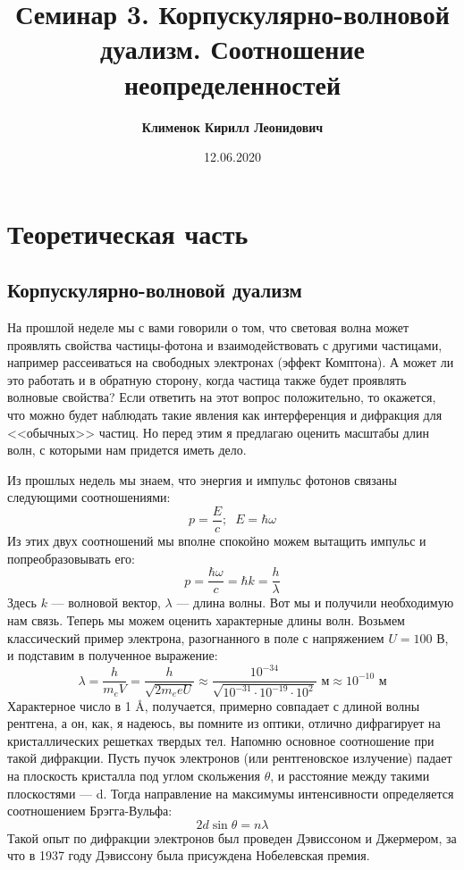 \documentclass[12pt]{article}
\begin{document}
 

\title{\textbf{Семинар 3. Корпускулярно-волновой дуализм. Соотношение неопределенностей}}
\author{\textbf{Клименок Кирилл Леонидович}}
\date{12.06.2020}
\maketitle

\section{Теоретическая часть}

\subsection{Корпускулярно-волновой дуализм}
На прошлой неделе мы с вами говорили о том, что световая волна может проявлять свойства частицы-фотона и взаимодействовать с другими частицами, например рассеиваться на свободных электронах (эффект Комптона). А может ли это работать и в обратную сторону, когда частица также будет проявлять волновые свойства? Если ответить на этот вопрос положительно, то окажется, что можно будет наблюдать такие явления как интерференция и дифракция для <<обычных>> частиц. Но перед этим я предлагаю оценить масштабы длин волн, с которыми нам придется иметь дело. 

\vspace{1em} \noindent
Из прошлых недель мы знаем, что энергия и импульс фотонов связаны следующими соотношениями:
\begin{equation*}
    p = \dfrac{E}{c}; \;\; E = \hbar \omega
\end{equation*}
Из этих двух соотношений мы вполне спокойно можем вытащить импульс и попреобразовывать его:
\begin{equation}
    p = \dfrac{\hbar \omega}{c} = \hbar k = \dfrac{h}{\lambda}
\end{equation}
Здесь $k$ --- волновой вектор, $\lambda$ --- длина волны. Вот мы и получили необходимую нам связь. Теперь мы можем оценить характерные длины волн. Возьмем классический пример электрона, разогнанного в поле с напряжением $U=100$ В, и подставим в полученное выражение:
\begin{equation*}
    \lambda = \dfrac{h}{m_eV} = \dfrac{h}{\sqrt{2m_eeU}} \approx \dfrac{10^{-34}}{\sqrt{10^{-31}\cdot10^{-19}\cdot10^{2}}} \text{ м} \approx 10^{-10} \text{ м}
\end{equation*}
Характерное число в 1 \AA, получается, примерно совпадает с длиной волны рентгена, а он, как, я надеюсь, вы помните из оптики, отлично дифрагирует на кристаллических решетках твердых тел. Напомню основное соотношение при такой дифракции. Пусть пучок электронов (или рентгеновское излучение) падает на плоскость кристалла под углом скольжения $\theta$, и расстояние между такими плоскостями --- d. Тогда направление на максимумы интенсивности определяется соотношением Брэгга-Вульфа: 
\begin{equation*}
    2d\sin{\theta} = n\lambda
\end{equation*}
Такой опыт по дифракции электронов был проведен Дэвиссоном и Джермером, за что в 1937 году Дэвиссону была присуждена Нобелевская премия.
\end{document}
